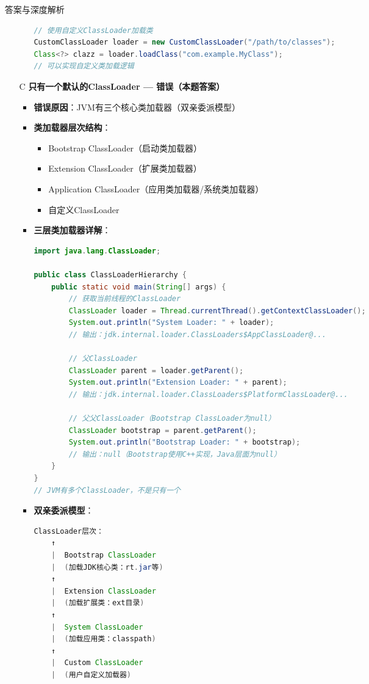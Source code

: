 \documentclass[12pt, a4paper]{ctexart}
\begin{document}
\begin{enumerate}[label=\textbf{\arabic*.}]
\begin{bluebox}{答案与深度解析}
\begin{itemize}[leftmargin=*, nosep, label={}]
\begin{itemize}[label={}, leftmargin=*, nosep]
\begin{lstlisting}[language=Java]
// 使用自定义ClassLoader加载类
CustomClassLoader loader = new CustomClassLoader("/path/to/classes");
Class<?> clazz = loader.loadClass("com.example.MyClass");
// 可以实现自定义类加载逻辑
				      \end{lstlisting}
			            \end{itemize}

			      \item[C] \textbf{只有一个默认的ClassLoader — 错误（本题答案）}
			            \begin{itemize}[label={}, leftmargin=*, nosep]
				            \item \textbf{错误原因}：JVM有三个核心类加载器（双亲委派模型）
				            \item \textbf{类加载器层次结构}：
				                  \begin{itemize}[label={}, nosep]
					                  \item Bootstrap ClassLoader（启动类加载器）
					                  \item Extension ClassLoader（扩展类加载器）
					                  \item Application ClassLoader（应用类加载器/系统类加载器）
					                  \item 自定义ClassLoader
				                  \end{itemize}
				            \item \textbf{三层类加载器详解}：
				                  \begin{lstlisting}[language=Java]
import java.lang.ClassLoader;

public class ClassLoaderHierarchy {
    public static void main(String[] args) {
        // 获取当前线程的ClassLoader
        ClassLoader loader = Thread.currentThread().getContextClassLoader();
        System.out.println("System Loader: " + loader);
        // 输出：jdk.internal.loader.ClassLoaders$AppClassLoader@...

        // 父ClassLoader
        ClassLoader parent = loader.getParent();
        System.out.println("Extension Loader: " + parent);
        // 输出：jdk.internal.loader.ClassLoaders$PlatformClassLoader@...

        // 父父ClassLoader（Bootstrap ClassLoader为null）
        ClassLoader bootstrap = parent.getParent();
        System.out.println("Bootstrap Loader: " + bootstrap);
        // 输出：null（Bootstrap使用C++实现，Java层面为null）
    }
}
// JVM有多个ClassLoader，不是只有一个
					      \end{lstlisting}
				            \item \textbf{双亲委派模型}：
				                  \begin{lstlisting}[language=Java]
ClassLoader层次：
    ↑
    |  Bootstrap ClassLoader
    |  (加载JDK核心类：rt.jar等)
    ↑
    |  Extension ClassLoader
    |  (加载扩展类：ext目录)
    ↑
    |  System ClassLoader
    |  (加载应用类：classpath)
    ↑
    |  Custom ClassLoader
    |  (用户自定义加载器)


\end{lstlisting}
\end{itemize}
\end{itemize}
\end{bluebox}
\end{enumerate}
\end{document}
